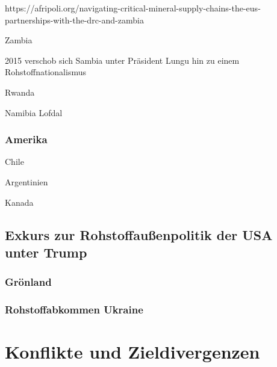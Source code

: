 \documentclass[12pt,a4paper,oneside]{book} %
\begin{document}
https://afripoli.org/navigating-critical-mineral-supply-chains-the-eus-partnerships-with-the-drc-and-zambia

Zambia

2015 verschob sich Sambia unter Präsident Lungu hin zu einem Rohstoffnationalismus 

Rwanda

Namibia
Lofdal 






\subsubsection{Amerika}
Chile

Argentinien

Kanada

\subsection{Exkurs zur Rohstoffaußenpolitik der USA unter Trump}

\subsubsection{Grönland}

\subsubsection{Rohstoffabkommen Ukraine}



\section{Konflikte und Zieldivergenzen}


	
\end{document}
